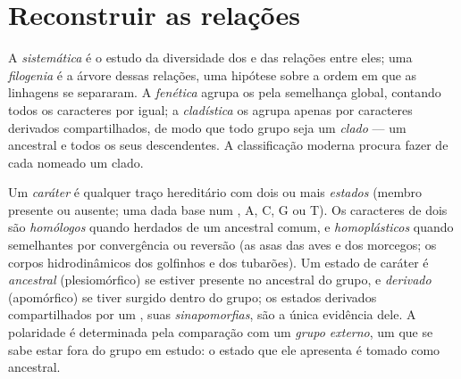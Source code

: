 \section{Reconstruir as relações}

\begin{definition}\label{def:b1:classifying-biodiversity:systematics}
A \emph{sistemática} é o estudo da diversidade dos  e das
relações entre eles; uma \emph{filogenia} é a árvore dessas relações,
uma hipótese sobre a ordem em que as linhagens se separaram. A
\emph{fenética} agrupa os  pela semelhança global, contando
todos os caracteres por igual; a \emph{cladística} os agrupa apenas
por caracteres derivados compartilhados, de modo que todo grupo seja um
\emph{clado} --- um ancestral e todos os seus descendentes. A
classificação moderna procura fazer de cada  nomeado um clado.
\end{definition}

\begin{definition}\label{def:b1:classifying-biodiversity:characters}
Um \emph{caráter} é qualquer traço hereditário com dois ou mais
\emph{estados} (membro presente ou ausente; uma dada base num , A,
C, G ou T). Os caracteres de dois  são \emph{homólogos}
quando herdados de um ancestral comum, e \emph{homoplásticos} quando
semelhantes por convergência ou reversão (as asas das aves e dos
morcegos; os corpos hidrodinâmicos dos golfinhos e dos tubarões). Um
estado de caráter é \emph{ancestral} (plesiomórfico) se estiver
presente no ancestral do grupo, e \emph{derivado} (apomórfico) se tiver
surgido dentro do grupo; os estados derivados compartilhados por um
, suas \emph{sinapomorfias}, são a única evidência dele. A
polaridade é determinada pela comparação com um \emph{grupo externo},
um  que se sabe estar fora do grupo em estudo: o estado que ele
apresenta é tomado como ancestral.
\end{definition}

